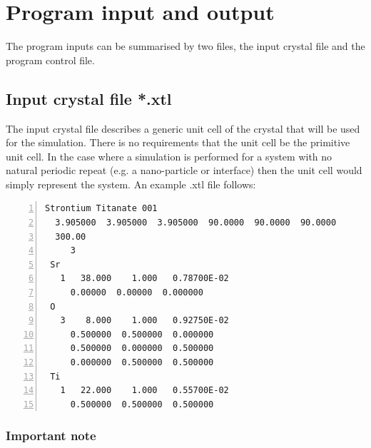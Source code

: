 \documentclass[12pt,a4paper]{article}
\begin{document}






\section{Program input and output}

The program inputs can be summarised by two files, the input crystal file and the program control file.

\subsection{Input crystal file *.xtl}
\label{xtl_input}

The input crystal file describes a generic unit cell of the crystal that will be used for the simulation.
There is no requirements that the unit cell be the primitive unit cell.
In the case where a simulation is performed for a system with no natural periodic repeat (e.g. a nano-particle or interface) then the unit cell would simply represent the system.
An example .xtl file follows: 
%
\begin{lstlisting}[language={},numbers=left,numberstyle=\tiny]
 Strontium Titanate 001
  3.905000  3.905000  3.905000  90.0000  90.0000  90.0000
  300.00
     3
 Sr
   1   38.000    1.000   0.78700E-02
     0.00000  0.00000  0.000000
 O 
   3    8.000    1.000   0.92750E-02
     0.500000  0.500000  0.000000
     0.500000  0.000000  0.500000
     0.000000  0.500000  0.500000
 Ti
   1   22.000    1.000   0.55700E-02
     0.500000  0.500000  0.500000
\end{lstlisting}

\subsubsection{Important note} 
\end{document}

